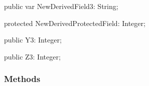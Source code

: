 \documentclass{report}
\newif\ifpdf
\begin{document}
\begin{list}{}
\begin{flushleft}
\ifpdf
\end{flushleft}
\fi


\par  \label{ok_inherited_members.TNewDerived-NewDerivedField3}
\item[\textbf{NewDerivedField3}\hfill]
\ifpdf
\begin{flushleft}
\fi
\begin{ttfamily}
public var NewDerivedField3: String;\end{ttfamily}

\ifpdf
\end{flushleft}
\fi


\par  \label{ok_inherited_members.TNewDerived-NewDerivedProtectedField}
\item[\textbf{NewDerivedProtectedField}\hfill]
\ifpdf
\begin{flushleft}
\fi
\begin{ttfamily}
protected NewDerivedProtectedField: Integer;\end{ttfamily}

\ifpdf
\end{flushleft}
\fi


\par  \label{ok_inherited_members.TNewDerived-Y3}
\item[\textbf{Y3}\hfill]
\ifpdf
\begin{flushleft}
\fi
\begin{ttfamily}
public Y3: Integer;\end{ttfamily}

\ifpdf
\end{flushleft}
\fi


\par  \label{ok_inherited_members.TNewDerived-Z3}
\item[\textbf{Z3}\hfill]
\ifpdf
\begin{flushleft}
\fi
\begin{ttfamily}
public Z3: Integer;\end{ttfamily}

\ifpdf
\end{flushleft}
\fi


\par  \end{list}
\subsubsection*{\large{\textbf{Methods}}\normalsize\hspace{1ex}\hfill}
\end{document}
